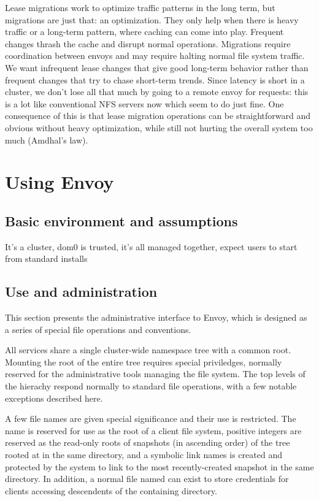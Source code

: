 Lease migrations work to optimize traffic patterns in the long term, but migrations are just that: an optimization. They only help when there is heavy traffic or a long-term pattern, where caching can come into play. Frequent changes thrash the cache and disrupt normal operations. Migrations require coordination between envoys and may require halting normal file system traffic. We want infrequent lease changes that give good long-term behavior rather than frequent changes that try to chase short-term trends. Since latency is short in a cluster, we don't lose all that much by going to a remote envoy for requests: this is a lot like conventional NFS servers now which seem to do just fine. One consequence of this is that lease migration operations can be straightforward and obvious without heavy optimization, while still not hurting the overall system too much (Amdhal's law).

\section{Using Envoy}

\subsection{Basic environment and assumptions}



It's a cluster, dom0 is trusted, it's all managed together, expect users to start from standard installs

\subsection{Use and administration}

This section presents the administrative interface to Envoy, which is designed as a series of special file operations and conventions.

All services share a single cluster-wide namespace tree with a common root. Mounting the root of the entire tree requires special priviledges, normally reserved for the administrative tools managing the file system. The top levels of the hierachy respond normally to standard file operations, with a few notable exceptions described here.

A few file names are given special significance and their use is restricted. The name \current is reserved for use as the root of a client file system, positive integers are reserved as the read-only roots of snapshots (in ascending order) of the tree rooted at \current in the same directory, and a symbolic link names \snapshot is created and protected by the system to link to the most recently-created snapshot in the same directory. In addition, a normal file named \password can exist to store credentials for clients accessing descendents of the containing directory.

